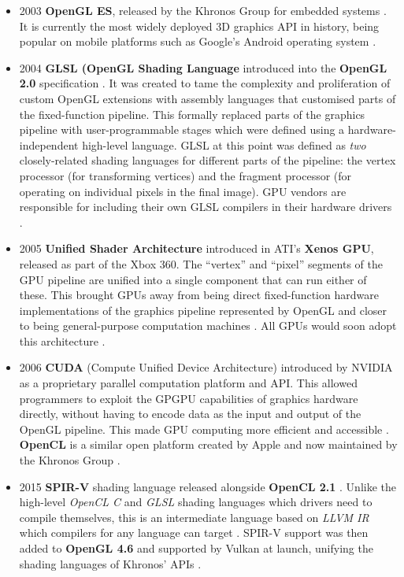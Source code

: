 \documentclass[a4paper,12pt,twoside,openright]{report}
\begin{document}
\begin{itemize}
    \item 2003 \textbf{OpenGL ES}, released by the Khronos Group for embedded
    systems \cite{OpenGLESRelease}. It is currently the most widely deployed 3D
    graphics API in history, being popular on mobile platforms such as Google's
    Android operating system \cite{OpenGLES}.

    \item 2004 \textbf{GLSL (OpenGL Shading Language} introduced into the
    \textbf{OpenGL 2.0} specification \cite{GLSL_1_10}. It was created to tame
    the complexity and proliferation of custom OpenGL extensions with assembly
    languages that customised parts of the fixed-function pipeline. This
    formally replaced parts of the graphics pipeline with user-programmable
    stages which were defined using a hardware-independent high-level language.
    GLSL at this point was defined as \textit{two} closely-related shading
    languages for different parts of the pipeline: the vertex processor (for
    transforming vertices) and the fragment processor (for operating on
    individual pixels in the final image). GPU vendors are responsible for
    including their own GLSL compilers in their hardware drivers
    \cite{TripThroughGraphicsPipeline1}.

    \item 2005 \textbf{Unified Shader Architecture} introduced in ATI's
    \textbf{Xenos GPU}, released as part of the Xbox 360. The ``vertex'' and
    ``pixel'' segments of the GPU pipeline are unified into a single component
    that can run either of these. This brought GPUs away from being direct
    fixed-function hardware implementations of the graphics pipeline
    represented by OpenGL and closer to being general-purpose computation
    machines \cite{XenosDemystified}. All GPUs would soon adopt this
    architecture \cite{HistoryOfTheGPU}.

    \item 2006 \textbf{CUDA} (Compute Unified Device Architecture) introduced
    by NVIDIA as a proprietary parallel computation platform and API. This
    allowed programmers to exploit the GPGPU capabilities of graphics hardware
    directly, without having to encode data as the input and output of the
    OpenGL pipeline. This made GPU computing more efficient and accessible
    \cite{AboutCUDA}. \textbf{OpenCL} is a similar open platform created by
    Apple and now maintained by the Khronos Group \cite{OpenCL}.

    \item 2015 \textbf{SPIR-V} shading language released alongside
    \textbf{OpenCL 2.1} \cite{SPIRVLaunch}. Unlike the high-level
    \textit{OpenCL C} and \textit{GLSL} shading languages which drivers need to
    compile themselves, this is an intermediate language based on \textit{LLVM
    IR} which compilers for any language can target \cite{LLVMIR} \cite{SPIRV}.
    SPIR-V support was then added to \textbf{OpenGL 4.6} and supported by
    Vulkan at launch, unifying the shading languages of Khronos' APIs
    \cite{SPIRVOpenGL}.


\end{itemize}
\end{document}
